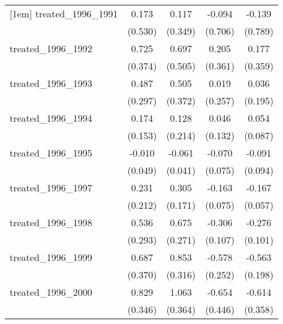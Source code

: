{\begin{tabular}{l*{4}{c}}
[1em]
treated\_1996\_1991&       0.173         &       0.117         &      -0.094         &      -0.139         \\
            &     (0.530)         &     (0.349)         &     (0.706)         &     (0.789)         \\
[1em]
treated\_1996\_1992&       0.725         &       0.697         &       0.205         &       0.177         \\
            &     (0.374)         &     (0.505)         &     (0.361)         &     (0.359)         \\
[1em]
treated\_1996\_1993&       0.487         &       0.505         &       0.019         &       0.036         \\
            &     (0.297)         &     (0.372)         &     (0.257)         &     (0.195)         \\
[1em]
treated\_1996\_1994&       0.174         &       0.128         &       0.046         &       0.054         \\
            &     (0.153)         &     (0.214)         &     (0.132)         &     (0.087)         \\
[1em]
treated\_1996\_1995&      -0.010         &      -0.061         &      -0.070         &      -0.091         \\
            &     (0.049)         &     (0.041)         &     (0.075)         &     (0.094)         \\
[1em]
treated\_1996\_1997&       0.231         &       0.305         &      -0.163\sym{*}  &      -0.167\sym{**} \\
            &     (0.212)         &     (0.171)         &     (0.075)         &     (0.057)         \\
[1em]
treated\_1996\_1998&       0.536         &       0.675\sym{*}  &      -0.306\sym{**} &      -0.276\sym{**} \\
            &     (0.293)         &     (0.271)         &     (0.107)         &     (0.101)         \\
[1em]
treated\_1996\_1999&       0.687         &       0.853\sym{**} &      -0.578\sym{*}  &      -0.563\sym{**} \\
            &     (0.370)         &     (0.316)         &     (0.252)         &     (0.198)         \\
[1em]
treated\_1996\_2000&       0.829\sym{*}  &       1.063\sym{**} &      -0.654         &      -0.614         \\
            &     (0.346)         &     (0.364)         &     (0.446)         &     (0.358)         \\

\end{tabular}}
